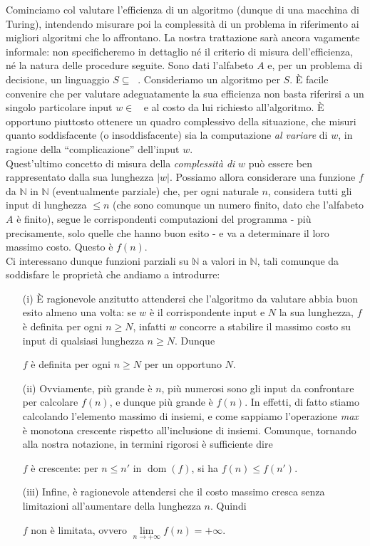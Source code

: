 \documentclass[12pt,a4paper]{report}
\theoremstyle{definition}
\DeclareMathOperator{\dom}{dom}
\DeclareMathOperator{\aaa}{\textit{A}^{\star}}
\begin{document}
Cominciamo col valutare l'efficienza di un algoritmo (dunque di una macchina di Turing), intendendo misurare poi la complessità di un problema in riferimento ai migliori algoritmi che lo affrontano. La nostra trattazione sarà ancora vagamente informale: non specificheremo in dettaglio né il criterio di misura dell'efficienza, né la natura delle procedure seguite. Sono dati l'alfabeto $A$ e, per un problema di decisione, un linguaggio $S \subseteq \aaa$. Consideriamo un algoritmo per $S$. È facile convenire che per valutare adeguatamente la sua efficienza non basta riferirsi a un singolo particolare input $w \in \aaa$ e al costo da lui richiesto all'algoritmo. È opportuno piuttosto ottenere un quadro complessivo della situazione, che misuri quanto soddisfacente (o insoddisfacente) sia la computazione \emph{al variare} di $w$, in ragione della ``complicazione'' dell'input $w$.\\
Quest'ultimo concetto di misura della \emph{complessità di} $w$ può essere ben rappresentato dalla sua lunghezza $|w|$. Possiamo allora considerare una funzione $f$ da $\mathbb{N}$ in $\mathbb{N}$ (eventualmente parziale) che, per ogni naturale $n$, considera tutti gli input di lunghezza $\leq n$ (che sono comunque un numero finito, dato che l'alfabeto $A$ è finito), segue le corrispondenti computazioni del programma - più precisamente, solo quelle che hanno buon esito - e va a determinare il loro massimo costo. Questo è $f(n)$.\\
Ci interessano dunque funzioni parziali su $\mathbb{N}$ a valori in $\mathbb{N}$, tali comunque da soddisfare le proprietà che andiamo a introdurre:
\begin{enumerate}
\item[(i)] È ragionevole anzitutto attendersi che l'algoritmo da valutare abbia buon esito almeno una volta: se $w$ è il corrispondente input e $N$ la sua lunghezza, $f$ è definita per ogni $n \geq N$, infatti $w$ concorre a stabilire il massimo costo su input di qualsiasi lunghezza $n \geq N$. Dunque\\
\centerline{$f$ è definita per ogni $n \geq N$ per un opportuno $N$.}
\item[(ii)] Ovviamente, più grande è $n$, più numerosi sono gli input da confrontare per calcolare $f(n)$, e dunque più grande è $f(n)$. In effetti, di fatto stiamo calcolando l'elemento massimo di insiemi, e come sappiamo l'operazione \emph{max} è monotona crescente rispetto all'inclusione di insiemi. Comunque, tornando alla nostra notazione, in termini rigorosi è sufficiente dire\\
\centerline{$f$ è crescente: per $n \leq n'$ in $\dom(f)$, si ha $f(n) \leq f(n')$.}
\item[(iii)] Infine, è ragionevole attendersi che il costo massimo cresca senza limitazioni all'aumentare della lunghezza $n$. Quindi\\
\centerline{$f$ non è limitata, ovvero $\lim\limits_{n \to +\infty} f(n) = +\infty$.}
\end{enumerate}
\end{document}
